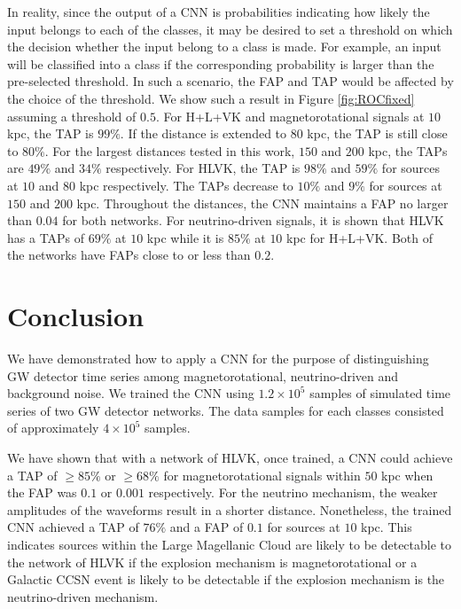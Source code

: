 \documentclass[aps,twocolumn,showpacs,groupedaddress, nofootinbib]{revtex4}  %
\begin{document}
In reality, since the output of a \ac{CNN} is probabilities indicating how likely the input belongs to each of the classes, 
it may be desired to set a threshold on which the decision whether the input belong to a class is made.
For example, an input will be classified into a class if the corresponding probability is larger than the pre-selected threshold.
In such a scenario, the \ac{FAP} and \ac{TAP} would be affected by the choice of the threshold.
We show such a result in Figure \ref{fig:ROCfixed} assuming a threshold of $0.5$. 
For H+L+VK and magnetorotational signals at $10$ kpc, the \ac{TAP} is $99\%$. 
If the distance is extended to $80$ kpc, the \ac{TAP} is still close to $80\%$.
For the largest distances tested in this work, $150$ and $200$ kpc, the \acp{TAP} are $49\%$ and $34\%$ respectively.
For HLVK, the \ac{TAP} is $98\%$ and $59\%$ for sources at $10$ and $80$ kpc respectively.
The \acp{TAP} decrease to $10\%$ and $9\%$ for sources at $150$ and $200$ kpc.
Throughout the distances, the \ac{CNN} maintains a \ac{FAP} no larger than $0.04$ for both networks.
For neutrino-driven signals, it is shown that HLVK has a \acp{TAP} of $69\%$ at $10$ kpc while it is $85\%$ at $10$ kpc for H+L+VK.
Both of the networks have \acp{FAP} close to or less than $0.2$.


\section{Conclusion}\label{sec:conclusion}
We have demonstrated how to apply a \ac{CNN} for the purpose of distinguishing \ac{GW} detector time series 
among magnetorotational, neutrino-driven and background noise. 
We trained the \ac{CNN} using $1.2\times10^{5}$ samples of simulated time series of two \ac{GW} detector networks.
The data samples for each classes consisted of approximately $4\times10^5$ samples. 

We have shown that with  a network of HLVK, once trained, a \ac{CNN} could achieve a \ac{TAP} of $\geq 85\%$ or $\geq 68\%$
for magnetorotational signals within $50$ kpc when the \ac{FAP} was $0.1$ or $0.001$ respectively.
For the neutrino mechanism, the weaker amplitudes of the waveforms result in a shorter distance.
Nonetheless, the trained \ac{CNN} achieved a \ac{TAP} of $76\%$ and a \ac{FAP} of $0.1$ for sources at $10$ kpc. 
This indicates sources within the Large Magellanic Cloud are likely to be detectable to the network of HLVK if the explosion mechanism is magnetorotational or 
a Galactic \ac{CCSN} event is likely to be detectable if the explosion mechanism is the neutrino-driven mechanism.
\end{document}
